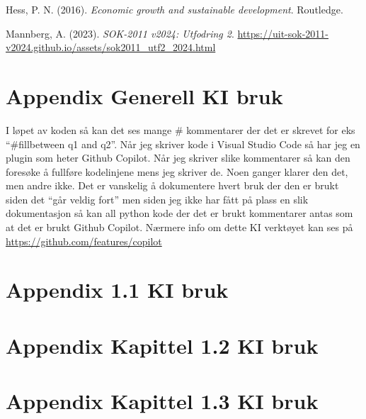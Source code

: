 \documentclass[
  12pt,
  a4paper,
  DIV=11,
  numbers=noendperiod]{scrartcl}
\newlength{\cslhangindent}
\newenvironment{CSLReferences}[2] %
 {\begin{list}{}{%
  \setlength{\itemindent}{0pt}
  \setlength{\leftmargin}{0pt}
  \setlength{\parsep}{0pt}
  \ifodd #1
   \setlength{\leftmargin}{\cslhangindent}
   \setlength{\itemindent}{-1\cslhangindent}
  \fi
  \setlength{\itemsep}{#2\baselineskip}}}
 {\end{list}}
\begin{document}
\label{refs}
\begin{CSLReferences}{1}{0}
Hess, P. N. (2016). \emph{Economic growth and sustainable development}.
Routledge.

Mannberg, A. (2023). \emph{SOK-2011 v2024: Utfodring 2}.
\url{https://uit-sok-2011-v2024.github.io/assets/sok2011_utf2_2024.html}

\end{CSLReferences}

\clearpage

\appendix

\section {Appendix Generell KI bruk}

I løpet av koden så kan det ses mange \# kommentarer der det er skrevet
for eks ``\#fillbetween q1 and q2''. Når jeg skriver kode i Visual
Studio Code så har jeg en plugin som heter Github Copilot. Når jeg
skriver slike kommentarer så kan den foresøke å fullføre kodelinjene
mens jeg skriver de. Noen ganger klarer den det, men andre ikke. Det er
vanskelig å dokumentere hvert bruk der den er brukt siden det ``går
veldig fort'' men siden jeg ikke har fått på plass en slik dokumentasjon
så kan all python kode der det er brukt kommentarer antas som at det er
brukt Github Copilot. Nærmere info om dette KI verktøyet kan ses på
\url{https://github.com/features/copilot}

\section {Appendix 1.1 KI bruk}

\section {Appendix Kapittel 1.2 KI bruk}

\section {Appendix Kapittel 1.3 KI bruk}
\end{document}

